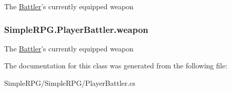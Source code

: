 The \hyperlink{class_simple_r_p_g_1_1_battler}{Battler}'s currently equipped weapon 

\hypertarget{class_simple_r_p_g_1_1_player_battler_af614fea2cfd5439070c57aab600a85cf}{
\subsubsection[{weapon}]{ Simple\-R\-P\-G.\-Player\-Battler.\-weapon\hspace{0.3cm}{\ttfamily [protected]}}}\label{class_simple_r_p_g_1_1_player_battler_af614fea2cfd5439070c57aab600a85cf}


The \hyperlink{class_simple_r_p_g_1_1_battler}{Battler}'s currently equipped weapon 



The documentation for this class was generated from the following file\-:\begin{DoxyCompactItemize}
\item 
Simple\-R\-P\-G/\-Simple\-R\-P\-G/Player\-Battler.\-cs\end{DoxyCompactItemize}
